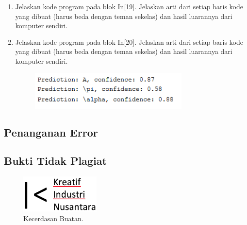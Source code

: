 \begin{enumerate}
	\item Jelaskan kode program pada blok  In[19]. Jelaskan arti dari setiap baris kode yang dibuat (harus beda dengan teman sekelas) dan hasil luarannya dari komputer sendiri.
	\hfill\break

	

	\item Jelaskan kode program pada blok  In[20]. Jelaskan arti dari setiap baris kode yang dibuat (harus beda dengan teman sekelas) dan hasil luarannya dari komputer sendiri.
	\hfill\break

	
	\begin{figure}[H]
		\includegraphics[width=8cm]{figures/1174006/chapter7/praktek/20.png}
		\centering
	\end{figure}

\end{enumerate}

\subsection{Penanganan Error}

\subsection{Bukti Tidak Plagiat}
\begin{figure}[H]
	\includegraphics[width=4cm]{kreatiflogo.png}
	\centering
	\caption{Kecerdasan Buatan.}
\end{figure}